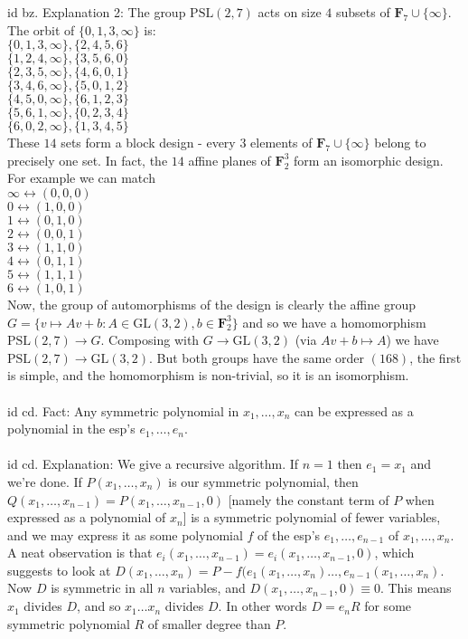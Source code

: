 \documentclass[oneside]{book}
\newcommand{\F}{\mathbf{F}}
\newcommand{\GL}{\mathrm{GL}}\newcommand{\SL}{\mathrm{SL}}
\newcommand{\PSL}{\mathrm{PSL}}
\newcommand{\set}[1]{\{ #1\}}
\begin{document}
id bz. Explanation 2: The group $\PSL(2,7)$ acts on size $4$ subsets of $\F_7\cup\set{\infty}$. The orbit of $\set{0,1,3,\infty}$ is:\\
$\set{0,1,3,\infty}, \set{2,4,5,6}$\\
$\set{1,2,4,\infty}, \set{3,5,6,0}$\\
$\set{2,3,5,\infty}, \set{4,6,0,1}$\\
$\set{3,4,6,\infty}, \set{5,0,1,2}$\\
$\set{4,5,0,\infty}, \set{6,1,2,3}$\\
$\set{5,6,1,\infty}, \set{0,2,3,4}$\\
$\set{6,0,2,\infty}, \set{1,3,4,5}$\\
These $14$ sets form a block design - every $3$ elements of $\F_7\cup\set{\infty}$ belong to precisely one set. In fact, the $14$ affine planes of $\F_2^3$ form an isomorphic design. For example we can match\\ 
$\infty\longleftrightarrow (0,0,0)$\\
$0\longleftrightarrow (1,0,0)$\\
$1\longleftrightarrow (0,1,0)$\\
$2\longleftrightarrow (0,0,1)$\\
$3\longleftrightarrow (1,1,0)$\\
$4\longleftrightarrow (0,1,1)$\\
$5\longleftrightarrow (1,1,1)$\\
$6\longleftrightarrow (1,0,1)$\\
Now, the group of automorphisms of the design is clearly the affine group $G=\set{v\mapsto Av+b:A\in\GL(3,2), b\in\F_2^3}$ and so we have a homomorphism $\PSL(2,7)\to G$. Composing with $G\to\GL(3,2)$ (via $Av+b\mapsto A$) we have $\PSL(2,7)\to \GL(3,2)$. But both groups have the same order $(168)$, the first is simple, and the homomorphism is non-trivial, so it is an isomorphism.\\\\


id cd. Fact: Any symmetric polynomial in $x_1,\dots,x_n$ can be expressed as a polynomial in the esp's $e_1,\dots,e_n$.\\\\


id cd. Explanation: We give a recursive algorithm. If $n=1$ then $e_1=x_1$ and we're done. If $P(x_1,\dots,x_n)$ is our symmetric polynomial, then $Q(x_1,\dots,x_{n-1})=P(x_1,\dots,x_{n-1},0)$ [namely the constant term of $P$ when expressed as a polynomial of $x_n$] is a symmetric polynomial of fewer variables, and we may express it as some polynomial $f$ of the esp's $e_1,\dots,e_{n-1}$ of $x_1,\dots,x_n$. A neat observation is that $e_i(x_1,\dots,x_{n-1})=e_i(x_1,\dots,x_{n-1},0)$, which suggests to look at $D(x_1,\dots,x_n)=P-f(e_1(x_1,\dots,x_n)\dots,e_{n-1}(x_1,\dots,x_n)$. Now $D$ is symmetric in all $n$ variables, and $D(x_1,\dots,x_{n-1},0)\equiv 0$. This means $x_1$ divides $D$, and so $x_1\dots x_n$ divides $D$. In other words $D=e_n R$ for some symmetric polynomial $R$ of smaller degree than $P$.
\end{document}

